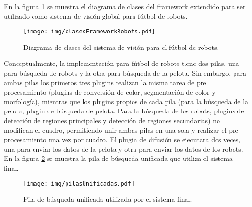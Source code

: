 En la figura \ref{clasesFrameworkRobots} se muestra el diagrama de clases del
framework extendido para ser utilizado como sistema de visión global para
fútbol de robots.

\begin{figure}[h]

	\texttt{[image: img/clasesFrameworkRobots.pdf]}

	\caption{Diagrama de clases del sistema de visión para el fútbol
	de robots.}

	\label{clasesFrameworkRobots}

\end{figure}

Conceptualmente, la implementación para fútbol de robots tiene dos pilas, una
para búsqueda de robots y la otra para búsqueda de la pelota. Sin embargo, para
ambas pilas los primeros tres plugins realizan la misma tarea de pre
procesamiento (plugins de conversión de color, segmentación de color y
morfología), mientras que los plugins propios de cada pila (para la búsqueda de
la pelota, plugin de búsqueda de pelota. Para la búsqueda de los robots, plugins
de detección de regiones principales y detección de regiones secundarias) no
modifican el cuadro, permitiendo unir ambas pilas en una sola y realizar el pre
procesamiento una vez por cuadro. El plugin de difusión se ejecutara dos veces,
una para enviar los datos de la pelota y otra para enviar los datos de los
robots. En la figura \ref{pilasUnificadas} se muestra la pila de búsqueda
unificada que utiliza el sistema final.

\begin{figure}[h]

	\centering

	\texttt{[image: img/pilasUnificadas.pdf]}

	\caption{Pila de búsqueda unificada utilizada por el sistema final.}

	\label{pilasUnificadas}

\end{figure}
